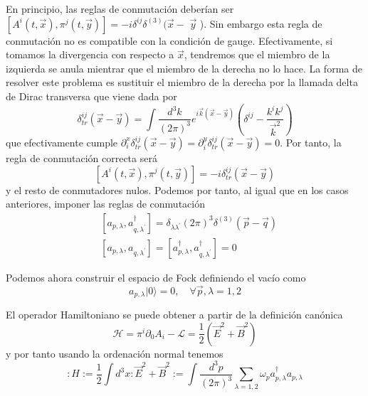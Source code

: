 En principio, las reglas de conmutación deberían ser $\left[A^{i}(t, \vec{x}), \pi^{j}(t, \vec{y})\right]=-i \delta^{i j} \delta^{(3)}(\vec{x}-$ $\vec{y}$ ). Sin embargo esta regla de conmutación no es compatible con la condición de gauge. Efectivamente, si tomamos la divergencia con respecto a $\vec{x}$, tendremos que el miembro de la izquierda se anula mientrar que el miembro de la derecha no lo hace. La forma de resolver este problema es sustituir el miembro de la derecha por la llamada delta de Dirac transversa que viene dada por
\begin{equation*}
\delta_{t r}^{i j}(\vec{x}-\vec{y})=\int \frac{d^{3} k}{(2 \pi)^{3}} e^{i \vec{k}(\vec{x}-\vec{y})}\left(\delta^{i j}-\frac{k^{i} k^{j}}{\vec{k}^{2}}\right) \tag{6.30}
\end{equation*}
que efectivamente cumple $\partial_{i}^{x} \delta_{t r}^{i j}(\vec{x}-\vec{y})=\partial_{i}^{y} \delta_{t r}^{i j}(\vec{x}-\vec{y})=0$. Por tanto, la regla de conmutación correcta será
\begin{equation*}
\left[A^{i}(t, \vec{x}), \pi^{j}(t, \vec{y})\right]=-i \delta_{t r}^{i j}(\vec{x}-\vec{y}) \tag{6.31}
\end{equation*}
y el resto de conmutadores nulos. Podemos por tanto, al igual que en los casos anteriores, imponer las reglas de conmutación
$$
\begin{align*}
& {\left[a_{p, \lambda}, a_{q, \lambda^{\prime}}^{\dagger}\right]=\delta_{\lambda \lambda^{\prime}}(2 \pi)^{3} \delta^{(3)}(\vec{p}-\vec{q})}  \tag{6.32}\\
& {\left[a_{p, \lambda}, a_{q, \lambda^{\prime}}\right]=\left[a_{p, \lambda}^{\dagger}, a_{q, \lambda^{\prime}}^{\dagger}\right]=0} \tag{6.33}
\end{align*}
$$

Podemos ahora construir el espacio de Fock definiendo el vacío como
\begin{equation*}
a_{p, \lambda}|0\rangle=0, \quad \forall \vec{p}, \lambda=1,2 \tag{6.34}
\end{equation*}

El operador Hamiltoniano se puede obtener a partir de la definición canónica
\begin{equation*}
\mathscr{H}=\pi^{i} \partial_{0} A_{i}-\mathscr{L}=\frac{1}{2}\left(\vec{E}^{2}+\vec{B}^{2}\right) \tag{6.35}
\end{equation*}
y por tanto usando la ordenación normal tenemos
\begin{equation*}
: H:=\frac{1}{2} \int d^{3} x: \vec{E}^{2}+\vec{B}^{2}:=\int \frac{d^{3} p}{(2 \pi)^{3}} \sum_{\lambda=1,2} \omega_{p} a_{p, \lambda}^{\dagger} a_{p, \lambda} \tag{6.36}
\end{equation*}

